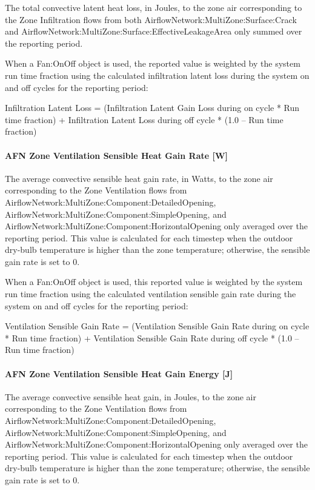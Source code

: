 The total convective latent heat loss, in Joules, to the zone air corresponding to the Zone Infiltration flows from both AirflowNetwork:MultiZone:Surface:Crack and AirflowNetwork:MultiZone:Surface:EffectiveLeakageArea only  summed over the reporting period.

When a Fan:OnOff object is used, the reported value is weighted by the system run time fraction using the calculated infiltration latent loss during the system on and off cycles for the reporting period:

Infiltration Latent Loss = (Infiltration Latent Gain Loss during on cycle * Run time fraction) + Infiltration Latent Loss during off cycle * (1.0 -- Run time fraction)

\paragraph{AFN Zone Ventilation Sensible Heat Gain Rate {[}W{]}}\label{afn-zone-ventilation-sensible-heat-gain-rate-w}

The average convective sensible heat gain rate, in Watts, to the zone air corresponding to the Zone Ventilation flows from AirflowNetwork:MultiZone:Component:DetailedOpening, AirflowNetwork:MultiZone:Component:SimpleOpening, and AirflowNetwork:MultiZone:Component:HorizontalOpening only averaged over the reporting period. This value is calculated for each timestep when the outdoor dry-bulb temperature is higher than the zone temperature; otherwise, the sensible gain rate is set to 0.

When a Fan:OnOff object is used, this reported value is weighted by the system run time fraction using the calculated ventilation sensible gain rate during the system on and off cycles for the reporting period:

Ventilation Sensible Gain Rate = (Ventilation Sensible Gain Rate during on cycle * Run time fraction) + Ventilation Sensible Gain Rate during off cycle * (1.0 -- Run time fraction)

\paragraph{AFN Zone Ventilation Sensible Heat Gain Energy {[}J{]}}\label{afn-zone-Ventilation-sensible-heat-gain-energy-j}

The average convective sensible heat gain, in Joules, to the zone air corresponding to the Zone Ventilation flows from AirflowNetwork:MultiZone:Component:DetailedOpening, AirflowNetwork:MultiZone:Component:SimpleOpening, and AirflowNetwork:MultiZone:Component:HorizontalOpening only averaged over the reporting period. This value is calculated for each timestep when the outdoor dry-bulb temperature is higher than the zone temperature; otherwise, the sensible gain rate is set to 0.

